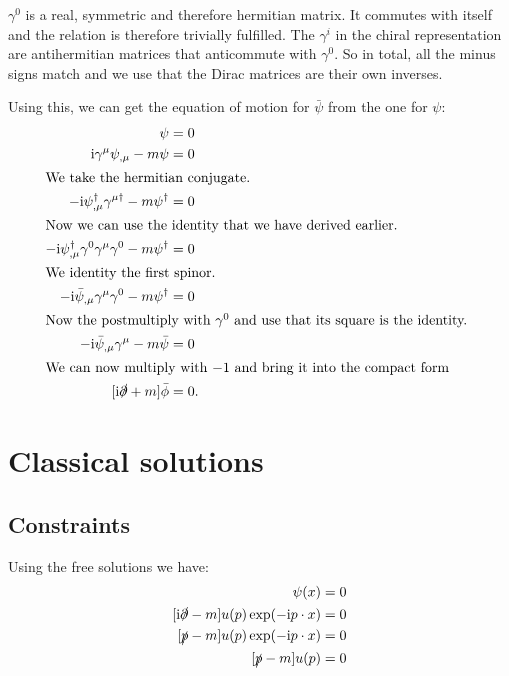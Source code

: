 \documentclass[11pt, english, fleqn, DIV=15, headinclude, BCOR=1cm]{scrartcl}
\begin{document}
$\gamma^0$ is a real, symmetric and therefore hermitian matrix. It commutes
with itself and the relation is therefore trivially fulfilled. The $\gamma^i$
in the chiral representation are antihermitian matrices that anticommute with
$\gamma^0$. So in total, all the minus signs match and we use that the Dirac
matrices are their own inverses.

Using this, we can get the equation of motion for $\bar\psi$ from the one for
$\psi$:
\begin{align*}
    [\iup \slashed\partial - m] \psi &= 0 \\
    \iup \gamma^\mu \psi_{,\mu} - m \psi &= 0 \\
    \intertext{%
        We take the hermitian conjugate.
    }
    - \iup \psi_{,\mu}^\dagger \gamma^{\mu\dagger} - m \psi^\dagger &= 0 \\
    \intertext{%
        Now we can use the identity that we have derived earlier.
    }
    - \iup \psi_{,\mu}^\dagger \gamma^0 \gamma^\mu \gamma^0 - m \psi^\dagger &= 0 \\
    \intertext{%
        We identity the first spinor.
    }
    - \iup \bar\psi_{,\mu} \gamma^\mu \gamma^0 - m \psi^\dagger &= 0 \\
    \intertext{%
        Now the postmultiply with $\gamma^0$ and use that its square is the
        identity.
    }
    - \iup \bar\psi_{,\mu} \gamma^\mu - m \bar\psi &= 0 \\
    \intertext{%
        We can now multiply with $-1$ and bring it into the compact form
    }
    [\iup \slashed\partial + m] \bar\phi &= 0.
\end{align*}

\section{Classical solutions}
\label{homework:2}

\subsection{Constraints}

Using the free solutions we have:
\begin{align*}
    [\iup \slashed\partial - m] \psi(x) &= 0 \\
    [\iup \slashed\partial - m] u(p) \exp(- \iup p \cdot x) &= 0 \\
    [\slashed p - m] u(p) \exp(- \iup p \cdot x) &= 0 \\
    [\slashed p - m] u(p) &= 0
\end{align*}
\end{document}
